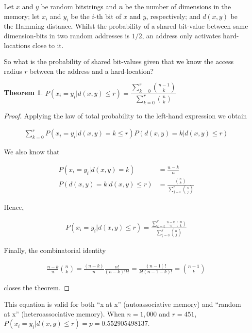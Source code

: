 \documentclass[12pt]{article}
\newtheorem{theorem}{Theorem}[section]
\begin{document}
Let $x$ and $y$ be random bitstrings and $n$ be the number of dimensions in the memory; let $x_i$ and $y_i$ be the $i$-th bit of $x$ and $y$, respectively; and $d(x, y)$ be the Hamming distance. Whilst the probability of a shared bit-value between same dimension-bits in two random addresses is $1/2$, an address only activates hard-locations close to it.

So what is the probability of shared bit-values given that we know the access radius $r$ between the address and a hard-location?
\bigskip

\begin{theorem}
\label{T1}
$P(x_i = y_i | d(x, y) \le r) = \dfrac{\sum_{k=0}^{r} \binom{n-1}{k}}{\sum_{k=0}^{r} \binom{n}{k}}$
\end{theorem}

\begin{proof}
    Applying the law of total probability to the left-hand expression we obtain

    \begin{align}
    \sum_{k=0}^{r} P(x_i = y_i | d(x, y) = k \le r) P(d(x, y) = k | d(x, y) \le r)
    \end{align}

    We also know that

    \begin{align}
    P(x_i = y_i | d(x, y) = k) &= \frac{n-k}{n} \\
    P(d(x, y) = k | d(x, y) \le r) &= \frac{\binom{n}{k}}{\sum_{j=0}^{r} \binom{n}{j}}
    \end{align}

    Hence,

    \begin{align}
    P(x_i = y_i | d(x, y) \le r) = \frac{\sum_{k=0}^{r} \frac{n-k}{n} \binom{n}{k}}{\sum_{j=0}^{r} \binom{n}{j}}
    \end{align}

    Finally, the combinatorial identity

    \begin{align}
    \frac{n-k}{n} \binom{n}{k} = \frac{(n-k)}{n} \frac{n!}{(n-k)! k!} = \frac{(n-1)!}{k! (n-1-k)!} = \binom{n-1}{k}
    \end{align}

    closes the theorem.

\end{proof}

This equation is valid for both ``x at x'' (autoassociative memory) and ``random at x'' (heteroassociative memory). When $n=1,000$ and $r=451$, $P(x_i = y_i | d(x, y) \le r) = p = 0.552905498137$.
\end{document}
